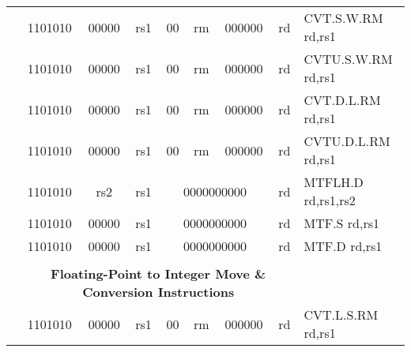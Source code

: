 \begin{table}[p]
\begin{small}
\begin{center}
\begin{tabular}{rcccccccccccl}
&
\multicolumn{2}{|c|}{1101010} &
\multicolumn{1}{c|}{00000} &
\multicolumn{1}{c|}{rs1} &
\multicolumn{1}{c|}{00} &
\multicolumn{2}{c|}{rm} &
\multicolumn{3}{c|}{000000} &
\multicolumn{1}{c|}{rd} & CVT.S.W.RM rd,rs1 \\
\cline{2-12}
  

&
\multicolumn{2}{|c|}{1101010} &
\multicolumn{1}{c|}{00000} &
\multicolumn{1}{c|}{rs1} &
\multicolumn{1}{c|}{00} &
\multicolumn{2}{c|}{rm} &
\multicolumn{3}{c|}{000000} &
\multicolumn{1}{c|}{rd} & CVTU.S.W.RM rd,rs1 \\
\cline{2-12}
  

&
\multicolumn{2}{|c|}{1101010} &
\multicolumn{1}{c|}{00000} &
\multicolumn{1}{c|}{rs1} &
\multicolumn{1}{c|}{00} &
\multicolumn{2}{c|}{rm} &
\multicolumn{3}{c|}{000000} &
\multicolumn{1}{c|}{rd} & CVT.D.L.RM rd,rs1 \\
\cline{2-12}
  

&
\multicolumn{2}{|c|}{1101010} &
\multicolumn{1}{c|}{00000} &
\multicolumn{1}{c|}{rs1} &
\multicolumn{1}{c|}{00} &
\multicolumn{2}{c|}{rm} &
\multicolumn{3}{c|}{000000} &
\multicolumn{1}{c|}{rd} & CVTU.D.L.RM rd,rs1 \\
\cline{2-12}
  

&
\multicolumn{2}{|c|}{1101010} &
\multicolumn{1}{c|}{rs2} &
\multicolumn{1}{c|}{rs1} &
\multicolumn{6}{c|}{0000000000} &
\multicolumn{1}{c|}{rd} & MTFLH.D rd,rs1,rs2 \\
\cline{2-12}
  

&
\multicolumn{2}{|c|}{1101010} &
\multicolumn{1}{c|}{00000} &
\multicolumn{1}{c|}{rs1} &
\multicolumn{6}{c|}{0000000000} &
\multicolumn{1}{c|}{rd} & MTF.S rd,rs1 \\
\cline{2-12}
  

&
\multicolumn{2}{|c|}{1101010} &
\multicolumn{1}{c|}{00000} &
\multicolumn{1}{c|}{rs1} &
\multicolumn{6}{c|}{0000000000} &
\multicolumn{1}{c|}{rd} & MTF.D rd,rs1 \\
\cline{2-12}
  

&
\multicolumn{11}{c}{} & \\
&
\multicolumn{11}{c}{\bf Floating-Point to Integer Move \& Conversion Instructions} & \\
\cline{2-12}
  

&
\multicolumn{2}{|c|}{1101010} &
\multicolumn{1}{c|}{00000} &
\multicolumn{1}{c|}{rs1} &
\multicolumn{1}{c|}{00} &
\multicolumn{2}{c|}{rm} &
\multicolumn{3}{c|}{000000} &
\multicolumn{1}{c|}{rd} & CVT.L.S.RM rd,rs1 \\
\cline{2-12}
  


\end{tabular}
\end{center}
\end{small}
\end{table}
